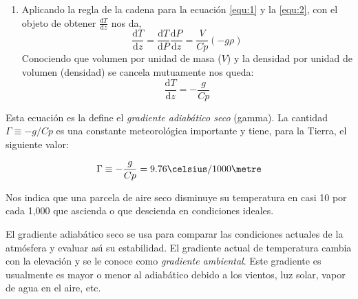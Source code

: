 \begin{enumerate}
\begin{equation}
P(z) = P(z+\mathrm{d}z) +\frac{g \rho A\,\mathrm{d}z}{A}
\end{equation}
\'o
\begin{equation}
dP =P(z+\mathrm{d}z) - P(z) = -g\rho\, \mathrm{d}z
\end{equation}
simplificando y factorizando tenemos la ecuaci\'on hidrost\'atica que se representa:
\begin{equation}
\frac{dP}{\mathrm{d}z}= -g\rho
\label{equ:2}
\end{equation}
\item Aplicando la regla de la cadena para  la ecuaci\'on \ref{equ:1}  y la   \ref{equ:2}, 
con el objeto de obtener $\frac{\mathrm{d}T}{\mathrm{d}z}$ nos da,
\begin{equation}
\frac{\mathrm{d}T}{\mathrm{d}z}=\frac{\mathrm{d}T}{\mathrm{d}P}\frac{\mathrm{d}P}{\mathrm{d}z} =\frac{V}{Cp}(-g\rho)
\end{equation}
Conociendo que volumen por unidad de masa ($V$) y la densidad por unidad de volumen (\gls{densidad}) se cancela mutuamente nos queda:
\begin{equation}
\frac{\mathrm{d}T}{\mathrm{d}z}=-\frac{g}{Cp}
\label{equ:3}
\end{equation}
\end{enumerate}

Esta ecuaci\'on es la define el \textit{gradiente adiab\'atico seco} (\gls{gamma}). La cantidad $\Gamma\equiv-g/Cp$  es una constante meteorol\'ogica importante y tiene, para la Tierra, el siguiente valor:

$$\Gamma \equiv-\frac{g}{Cp}=9.76{\celsius}/1000{\metre}$$

Nos indica que una parcela de aire seco disminuye su temperatura en casi 10{\celsius} por cada 1,000{\metre} que ascienda o que descienda en condiciones ideales.

El gradiente adiab\'atico seco se usa para comparar las condiciones actuales de la atm\'osfera y evaluar as\'{\i} su estabilidad. El gradiente actual de temperatura cambia con la elevaci\'on y se le conoce como  \textit{gradiente ambiental}. Este gradiente es usualmente es mayor o menor al adiab\'atico debido a los vientos, luz solar, vapor de agua en el aire, etc.

